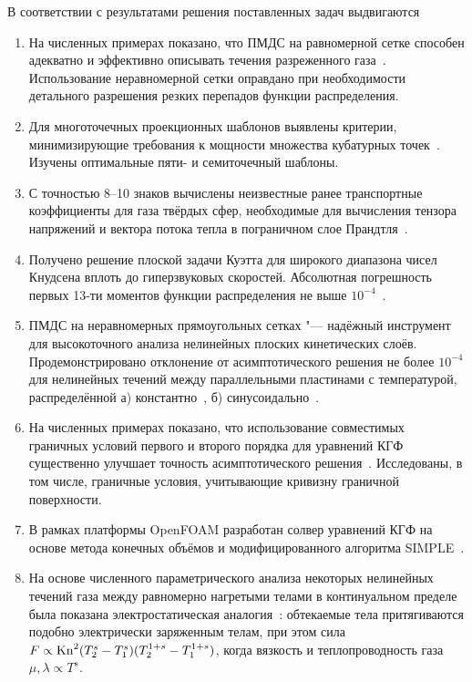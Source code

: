 В соответствии с результатами решения поставленных задач выдвигаются {}
\begin{enumerate}
    \item\label{defpos:uniform_grid} %
    На численных примерах показано, что ПМДС на равномерной сетке
    способен адекватно и эффективно описывать течения разреженного газа~\cite{Rogozin2010, Rogozin2011, Rogozin2017}.
    Использование неравномерной сетки оправдано при необходимости детального разрешения резких перепадов функции распределения.
    \item\label{defpos:stencils} %
    Для многоточечных проекционных шаблонов выявлены критерии,
    минимизирующие требования к мощности множества кубатурных точек~\cite{Rogozin2016}.
    Изучены оптимальные пяти- и семиточечный шаблоны.
    \item\label{defpos:transport_coeffs} %
    С точностью 8--10 знаков вычислены неизвестные ранее транспортные коэффициенты для газа твёрдых сфер,
    необходимые для вычисления тензора напряжений и вектора потока тепла в пограничном слое Прандтля~\cite{Rogozin2016}.
    \item\label{defpos:Couette_flow} %
    Получено решение плоской задачи Куэтта для широкого диапазона чисел Кнудсена вплоть до гиперзвуковых скоростей.
    Абсолютная погрешность первых 13-ти моментов функции распределения не выше \(10^{-4}\)~\cite{Rogozin2016}.
    \item\label{defpos:asymptotic_verification} %
    ПМДС на неравномерных прямоугольных сетках "--- надёжный инструмент для высокоточного анализа
    нелинейных плоских кинетических слоёв. Продемонстрировано отклонение от асимптотического
    решения не более \(10^{-4}\) для нелинейных течений между параллельными пластинами с температурой,
    распределённой а) константно~\cite{Rogozin2016}, б) синусоидально~\cite{Rogozin2017}.
    \item\label{defpos:boundary_conditions} %
    На численных примерах показано, что использование совместимых граничных условий первого и второго порядка
    для уравнений КГФ существенно улучшает точность асимптотического решения~\cite{Rogozin2017}.
    Исследованы, в том числе, граничные условия, учитывающие кривизну граничной поверхности.
    \item\label{defpos:snit_solver} %
    В рамках платформы OpenFOAM разработан солвер уравнений КГФ
    на основе метода конечных объёмов и модифицированного алгоритма SIMPLE~\cite{Rogozin2014}.
    \item\label{defpos:snit_forces} %
    На основе численного параметрического анализа некоторых нелинейных течений газа
    между равномерно нагретыми телами в континуальном пределе была показана
    электростатическая аналогия~\cite{Rogozin2014}:
    обтекаемые тела притягиваются подобно электрически заряженным телам,
    при этом сила \(F\propto\mathrm{Kn}^2(T_2^s-T_1^s)(T_2^{1+s}-T_1^{1+s})\),
    когда вязкость и теплопроводность газа \(\mu, \lambda \propto T^s\).
\end{enumerate}


